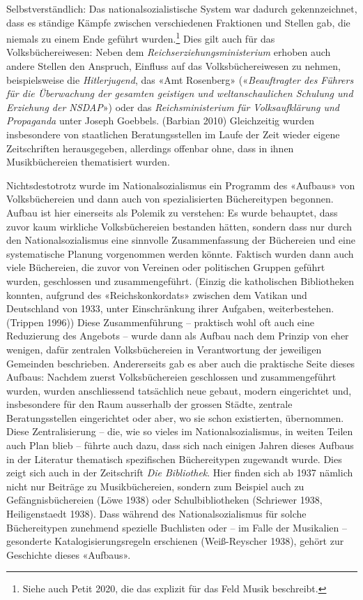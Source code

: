 \documentclass[a4paper,
fontsize=11pt,
oneside,
numbers=noperiodatend,
parskip=half-,
bibliography=totoc,
final
]{scrartcl}
\begin{document}
Selbstverständlich: Das nationalsozialistische System war dadurch
gekennzeichnet, dass es ständige Kämpfe zwischen verschiedenen
Fraktionen und Stellen gab, die niemals zu einem Ende geführt
wurden.\footnote{Siehe auch Petit 2020, die das explizit für das Feld
  Musik beschreibt.} Dies gilt auch für das Volksbüchereiwesen: Neben
dem \emph{Reichserziehungsministerium} erhoben auch andere Stellen den
Anspruch, Einfluss auf das Volksbüchereiwesen zu nehmen, beispielsweise
die \emph{Hitlerjugend}, das «Amt Rosenberg» («\emph{Beauftragter des
Führers für die Überwachung der gesamten geistigen und weltanschaulichen
Schulung und Erziehung der NSDAP}») oder das \emph{Reichsministerium für
Volksaufklärung und Propaganda} unter Joseph Goebbels. (Barbian 2010)
Gleichzeitig wurden insbesondere von staatlichen Beratungsstellen im
Laufe der Zeit wieder eigene Zeitschriften herausgegeben, allerdings
offenbar ohne, dass in ihnen Musikbüchereien thematisiert wurden.

Nichtsdestotrotz wurde im Nationalsozialismus ein Programm des «Aufbaus»
von Volksbüchereien und dann auch von spezialisierten Büchereitypen
begonnen. Aufbau ist hier einerseits als Polemik zu verstehen: Es wurde
behauptet, dass zuvor kaum wirkliche Volksbüchereien bestanden hätten,
sondern dass nur durch den Nationalsozialismus eine sinnvolle
Zusammenfassung der Büchereien und eine systematische Planung
vorgenommen werden könnte. Faktisch wurden dann auch viele Büchereien,
die zuvor von Vereinen oder politischen Gruppen geführt wurden,
geschlossen und zusammengeführt. (Einzig die katholischen Bibliotheken
konnten, aufgrund des «Reichskonkordats» zwischen dem Vatikan und
Deutschland von 1933, unter Einschränkung ihrer Aufgaben,
weiterbestehen. (Trippen 1996)) Diese Zusammenführung -- praktisch wohl
oft auch eine Reduzierung des Angebots -- wurde dann als Aufbau nach dem
Prinzip von eher wenigen, dafür zentralen Volksbüchereien in
Verantwortung der jeweiligen Gemeinden beschrieben. Andererseits gab es
aber auch die praktische Seite dieses Aufbaus: Nachdem zuerst
Volksbüchereien geschlossen und zusammengeführt wurden, wurden
anschliessend tatsächlich neue gebaut, modern eingerichtet und,
insbesondere für den Raum ausserhalb der grossen Städte, zentrale
Beratungsstellen eingerichtet oder aber, wo sie schon existierten,
übernommen. Diese Zentralisierung -- die, wie so vieles im
Nationalsozialismus, in weiten Teilen auch Plan blieb -- führte auch
dazu, dass sich nach einigen Jahren dieses Aufbaus in der Literatur
thematisch spezifischen Büchereitypen zugewandt wurde. Dies zeigt sich
auch in der Zeitschrift \emph{Die Bibliothek}. Hier finden sich ab 1937
nämlich nicht nur Beiträge zu Musikbüchereien, sondern zum Beispiel auch
zu Gefängnisbüchereien (Löwe 1938) oder Schulbibliotheken (Schriewer
1938, Heiligenstaedt 1938). Dass während des Nationalsozialismus für
solche Büchereitypen zunehmend spezielle Buchlisten oder -- im Falle der
Musikalien -- gesonderte Katalogisierungsregeln erschienen
(Weiß-Reyscher 1938), gehört zur Geschichte dieses «Aufbaus».
\end{document}
